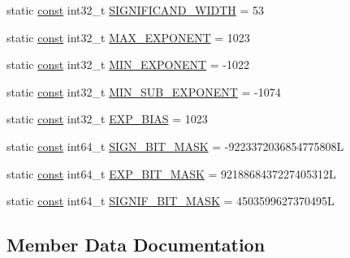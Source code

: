 \begin{DoxyCompactItemize}
\item 
static \mbox{\hyperlink{ZlibCrc32_8h_a2c212835823e3c54a8ab6d95c652660e}{const}} int32\+\_\+t \mbox{\hyperlink{classlucene_1_1core_1_1util_1_1numeric_1_1DoubleConsts_a90d448bae70d1db2c007295872d25b8f}{S\+I\+G\+N\+I\+F\+I\+C\+A\+N\+D\+\_\+\+W\+I\+D\+TH}} = 53
\item 
static \mbox{\hyperlink{ZlibCrc32_8h_a2c212835823e3c54a8ab6d95c652660e}{const}} int32\+\_\+t \mbox{\hyperlink{classlucene_1_1core_1_1util_1_1numeric_1_1DoubleConsts_a788bb598d330d97a3c3ed0a7b7aa6806}{M\+A\+X\+\_\+\+E\+X\+P\+O\+N\+E\+NT}} = 1023
\item 
static \mbox{\hyperlink{ZlibCrc32_8h_a2c212835823e3c54a8ab6d95c652660e}{const}} int32\+\_\+t \mbox{\hyperlink{classlucene_1_1core_1_1util_1_1numeric_1_1DoubleConsts_ac06173f71bc53baa1bd48339c4f51e7b}{M\+I\+N\+\_\+\+E\+X\+P\+O\+N\+E\+NT}} = -\/1022
\item 
static \mbox{\hyperlink{ZlibCrc32_8h_a2c212835823e3c54a8ab6d95c652660e}{const}} int32\+\_\+t \mbox{\hyperlink{classlucene_1_1core_1_1util_1_1numeric_1_1DoubleConsts_ab114119218bfbc1ba0284d34193b2056}{M\+I\+N\+\_\+\+S\+U\+B\+\_\+\+E\+X\+P\+O\+N\+E\+NT}} = -\/1074
\item 
static \mbox{\hyperlink{ZlibCrc32_8h_a2c212835823e3c54a8ab6d95c652660e}{const}} int32\+\_\+t \mbox{\hyperlink{classlucene_1_1core_1_1util_1_1numeric_1_1DoubleConsts_a0b377d2d6fbbc2c49834222e8f627aa6}{E\+X\+P\+\_\+\+B\+I\+AS}} = 1023
\item 
static \mbox{\hyperlink{ZlibCrc32_8h_a2c212835823e3c54a8ab6d95c652660e}{const}} int64\+\_\+t \mbox{\hyperlink{classlucene_1_1core_1_1util_1_1numeric_1_1DoubleConsts_ad5402d786e30e634a27fa5463dcd6d7f}{S\+I\+G\+N\+\_\+\+B\+I\+T\+\_\+\+M\+A\+SK}} = -\/9223372036854775808L
\item 
static \mbox{\hyperlink{ZlibCrc32_8h_a2c212835823e3c54a8ab6d95c652660e}{const}} int64\+\_\+t \mbox{\hyperlink{classlucene_1_1core_1_1util_1_1numeric_1_1DoubleConsts_a112ccf516b95834fd93b1f94b77d23b5}{E\+X\+P\+\_\+\+B\+I\+T\+\_\+\+M\+A\+SK}} = 9218868437227405312L
\item 
static \mbox{\hyperlink{ZlibCrc32_8h_a2c212835823e3c54a8ab6d95c652660e}{const}} int64\+\_\+t \mbox{\hyperlink{classlucene_1_1core_1_1util_1_1numeric_1_1DoubleConsts_afdddc1e65c90d6e61cd798aea7e26735}{S\+I\+G\+N\+I\+F\+\_\+\+B\+I\+T\+\_\+\+M\+A\+SK}} = 4503599627370495L
\end{DoxyCompactItemize}


\subsection{Member Data Documentation}
\mbox{\label{classlucene_1_1core_1_1util_1_1numeric_1_1DoubleConsts_a0b377d2d6fbbc2c49834222e8f627aa6}} 
